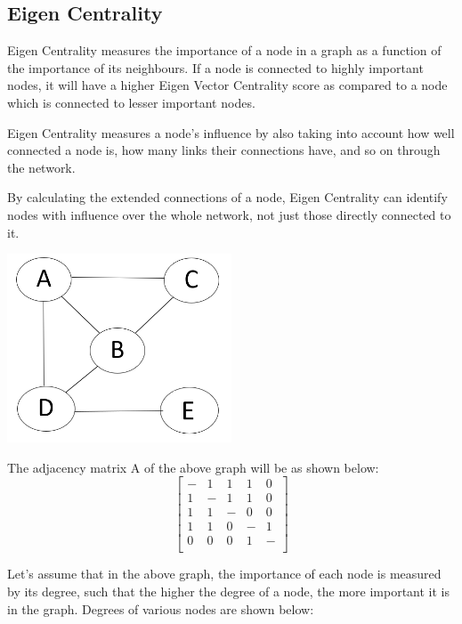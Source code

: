 \documentclass[12pt, a4paper]{article}
\begin{document}
    \subsection{Eigen Centrality}
    \begin{flushleft}

    Eigen Centrality measures the importance of a node in a graph as a function of the importance of its neighbours. If a node is connected to highly important nodes, it will have a higher Eigen Vector Centrality score as compared to a node which is connected to lesser important nodes.
    
    Eigen Centrality measures a node’s influence by also taking into account how well connected a node is, how many links their connections have, and so on through the network.
    
    By calculating the extended connections of a node, Eigen Centrality can identify nodes with influence over the whole network, not just those directly connected to it.

    \includegraphics[width=0.5\textwidth, center]{graph}
    
    The adjacency matrix A of the above graph will be as shown below:
    \begin{equation*}
    \begin{bmatrix}
    - & 1 & 1 & 1 & 0 \\
    1 & - & 1 & 1 & 0 \\
    1 & 1 & - & 0 & 0 \\
    1 & 1 & 0 & - & 1 \\
    0 & 0 & 0 & 1 & - \\

    \end{bmatrix}
    \end{equation*}
    
    Let’s assume that in the above graph, the importance of each node is measured by its degree, such that the higher the degree of a node, the more important it is in the graph. Degrees of various nodes are shown below:
    

\end{flushleft}
\end{document}
